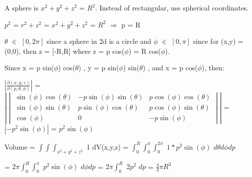     \begin{tbox}
        A sphere is $x^2 + y^2 + z^2$ = $R^2$.
        Instead of rectangular, use spherical coordinates.

        \hspace{0.5cm}
        $p^2$ = $r^2 + z^2$ = $x^2 + y^2 + z^2$ = $R^2$
        \hspace{1cm}
        $\Rightarrow$
        \hspace{1cm}
        p = R

        $\theta$ $\in$ $[0,2\pi]$ since a sphere in 2d is a circle
        and $\phi$ $\in$ $[0,\pi]$ since for (x,y) = (0,0), then
        z = [-R,R] where z = p cos($\phi$) = R cos($\phi$).

        Since x = p sin($\phi$) cos($\theta$) ,
        y = p sin($\phi$) sin($\theta$) ,
        and x = p cos($\phi$), then:

        \hspace{0.5cm}
        $|\frac{\partial(x,y,z)}{\partial(p,\theta,\phi)}|$
        = $|\begin{vmatrix}
            \scriptstyle \sin(\phi) \cos(\theta)
            & \scriptstyle -p \sin(\phi) \sin(\theta)
            & \scriptstyle p \cos(\phi) \cos(\theta) \\

            \scriptstyle \sin(\phi) \sin(\theta)
            & \scriptstyle p \sin(\phi) \cos(\theta)
            & \scriptstyle p \cos(\phi) \sin(\theta) \\

            \scriptstyle \cos(\phi)
            & \scriptstyle 0
            & \scriptstyle -p \sin(\phi)
        \end{vmatrix}|$
        = $|-p^2 \sin(\phi)|$
        = $p^2 \sin(\phi)$

        Volume
        = $\int \int \int_{x^2+y^2+z^2}$ 1 dV(x,y,z)
        = $\int_0^R \int_0^{\pi} \int_0^{2\pi}$
            $1 * p^2 \sin(\phi)$ $d\theta d\phi dp$

        \hspace{1.3cm}
        = $2\pi \int_0^R \int_0^{\pi}$
            $p^2 \sin(\phi)$ $d\phi dp$
        = $2\pi \int_0^R$ $2p^2$ $dp$ 
        = $\frac{4}{3} \pi R^3$
    \end{tbox}




